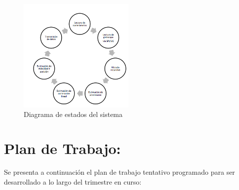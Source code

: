 \documentclass{article}
\begin{document}
\begin{figure}[h!]
	\centering
	\includegraphics[width=0.5\textwidth]{diagrama2.png}
	\caption{Diagrama de estados del sistema}
	\label{fig:maqn}
\end{figure}

\section{Plan de Trabajo:} 
    Se presenta a continuación el plan de trabajo tentativo programado para ser desarrollado a lo largo del trimestre en curso:
\end{document}
